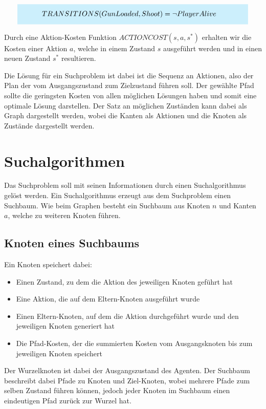 \[
\highlightbox{0.9\textwidth}{$
    \begin{aligned}
			TRANSITIONS(GunLoaded, Shoot) &= \lnot PlayerAlive
    \end{aligned}
$}
\]

Durch eine Aktion-Kosten Funktion $ACTIONCOST(s,a,s^*)$ erhalten wir die Kosten einer Aktion $a$, welche in einem Zustand $s$ ausgeführt werden und in einen neuen Zustand $s^*$ resultieren.

Die Lösung für ein Suchproblem ist dabei ist die Sequenz an Aktionen, also der Plan der vom Ausgangszustand zum Zielzustand führen soll. Der gewählte Pfad sollte die geringsten Kosten von allen möglichen Lösungen haben und somit eine optimale Lösung darstellen. Der Satz an möglichen Zuständen kann dabei als Graph dargestellt werden, wobei die Kanten als Aktionen und die Knoten als Zustände dargestellt werden.


\section{Suchalgorithmen}

Das Suchproblem soll mit seinen Informationen durch einen Suchalgorithmus gelöst werden. Ein Suchalgorithmus erzeugt aus dem Suchproblem einen Suchbaum. Wie beim Graphen besteht ein Suchbaum aus Knoten $n$ und Kanten $a$, welche zu weiteren Knoten führen. 


\subsection{Knoten eines Suchbaums}

Ein Knoten speichert dabei:
\begin{itemize}
	\item Einen Zustand, zu dem die Aktion des jeweiligen Knoten geführt hat
	\item Eine Aktion, die auf dem Eltern-Knoten ausgeführt wurde
	\item Einen Eltern-Knoten, auf dem die Aktion durchgeführt wurde und den jeweiligen Knoten generiert hat
	\item Die Pfad-Kosten, der die summierten Kosten vom Ausgangsknoten bis zum jeweiligen Knoten speichert
\end{itemize}
Der Wurzelknoten ist dabei der Ausgangszustand des Agenten. Der Suchbaum beschreibt dabei Pfade zu Knoten und Ziel-Knoten, wobei mehrere Pfade zum selben Zustand führen können, jedoch jeder Knoten im Suchbaum einen eindeutigen Pfad zurück zur Wurzel hat.


